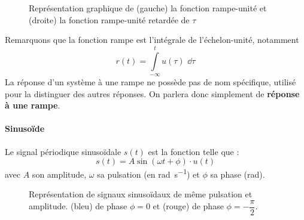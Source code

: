 \begin{figure}[!h]
\begin{center}

\end{center}
\caption{Représentation graphique de (gauche) la fonction rampe-unité et 
                                     (droite) la fonction rampe-unité retardée
                                     de $\tau$
\label{fig-rampe}}
\end{figure}
Remarquons que la fonction rampe est l'intégrale de l'échelon-unité, notamment 
$$
r(t)=\int\limits_{-\infty}^{t} u(\tau)\,\,\dd{\tau}
$$
La réponse d'un système à une rampe ne possède pas de nom spécifique, 
utilisé pour la distinguer des autres réponses. On parlera donc simplement 
de \textbf{réponse à une rampe}. 
\paragraph{Sinuso\"ide}
Le signal périodique sinuso\"idale $s(t)$ est la fonction telle que :
$$
s(t)=A\sin{(\omega t +\phi)}\cdot u(t)
$$
avec $A$ son amplitude, $\omega$ sa pulsation (en \si{\radian\per\second}) 
et $\phi$ sa phase (\si{\radian}).
\begin{figure}[!h]
\begin{center}

\end{center}
\caption{Représentation de signaux sinuso\"idaux de même pulsation 
       et amplitude. (bleu) de phase $\phi=0$ et 
       (rouge) de phase $\phi=-\dfrac{\pi}{2}$.
\label{fig-sin}}
\end{figure}

